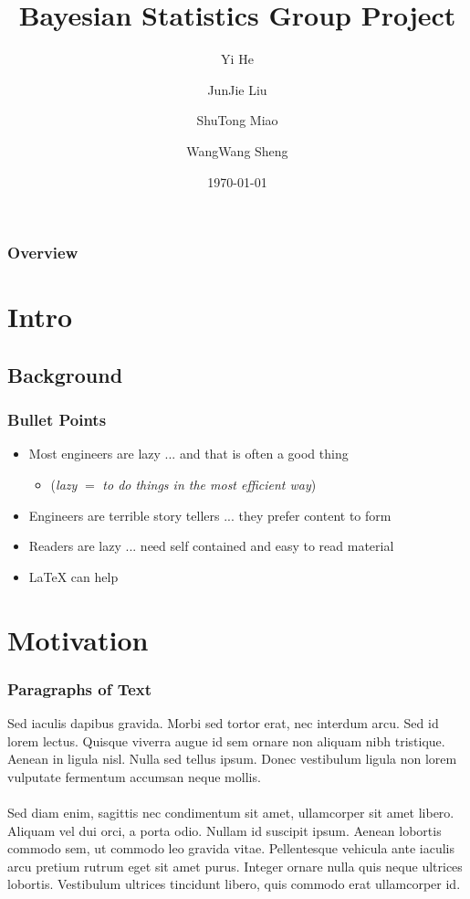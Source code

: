 \documentclass[10pt,aspectratio=32]{beamer}
\title{Bayesian Statistics Group Project \\ }
\subtitle{}
\author{Yi He \and JunJie Liu \and ShuTong Miao \and WangWang Sheng}
\institute{United International College Statistics Year Three}
\date{\today}
\begin{document}
\AtBeginSection[]{\frame{\sectionpage}} %

\begin{frame}
	\titlepage
\end{frame}

\begin{frame}
	\frametitle{Overview}
	\vspace{-0.7cm}
	\tableofcontents
\end{frame}

\section{Intro}
\subsection{Background}
\begin{frame}
\frametitle{Bullet Points}
\vspace{-0.3cm}

\begin{itemize}
	\item Most engineers are lazy ... and that is often a good thing
	\begin{itemize}
		\item (\textit{lazy} $=$ \textit{to do things in the most efficient way})
	\end{itemize}
	\item Engineers are terrible story tellers ... they prefer content to form
	\item Readers are lazy ... need self contained and easy to read material
	\item \LaTeX{} can help
\end{itemize}

 \end{frame}


\section{Motivation}
\begin{frame}
	\frametitle{Paragraphs of Text}
	\vspace{-0.8cm}
	Sed iaculis dapibus gravida. Morbi sed tortor erat, nec interdum arcu. Sed id lorem lectus. Quisque viverra augue id sem ornare non aliquam nibh tristique. Aenean in ligula nisl. Nulla sed tellus ipsum. Donec vestibulum ligula non lorem vulputate fermentum accumsan neque mollis.\\~\\

	Sed diam enim, sagittis nec condimentum sit amet, ullamcorper sit amet libero. Aliquam vel dui orci, a porta odio. Nullam id suscipit ipsum. Aenean lobortis commodo sem, ut commodo leo gravida vitae. Pellentesque vehicula ante iaculis arcu pretium rutrum eget sit amet purus. Integer ornare nulla quis neque ultrices lobortis. Vestibulum ultrices tincidunt libero, quis commodo erat ullamcorper id.
\end{frame}
\end{document}
